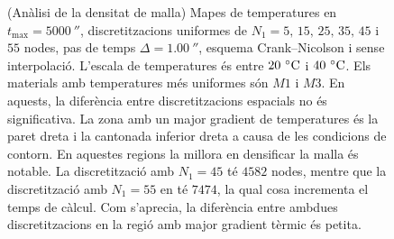 \begin{figure}[ht]
\begin{subfigure}{.5\textwidth}
		\label{Temps fig:malla_6}
	\end{subfigure}
	\caption{(Anàlisi de la densitat de malla) Mapes de temperatures en $t_\text{max} = 5000 \ \second$, discretitzacions uniformes de $N_1 = 5, \, 15, \, 25, \, 35, \, 45$ i $55$ nodes, pas de temps $\Delta = 1.00 \ \second$, esquema Crank--Nicolson i sense interpolació. L'escala de temperatures és entre $20 \ \celsius$ i $40 \ \celsius$. Els materials amb temperatures més uniformes són $M1$ i $M3$. En aquests, la diferència entre discretitzacions espacials no és significativa. La zona amb un major gradient de temperatures és la paret dreta i la cantonada inferior dreta a causa de les condicions de contorn. En aquestes regions la millora en densificar la malla és notable. La discretització amb $N_1 = 45$ té $4582$ nodes, mentre que la discretització amb $N_1 = 55$ en té $7474$, la qual cosa incrementa el temps de càlcul. Com s'aprecia, la diferència entre ambdues discretitzacions en la regió amb major gradient tèrmic és petita.}
	\label{fig:malla_5000}
\end{figure} 

